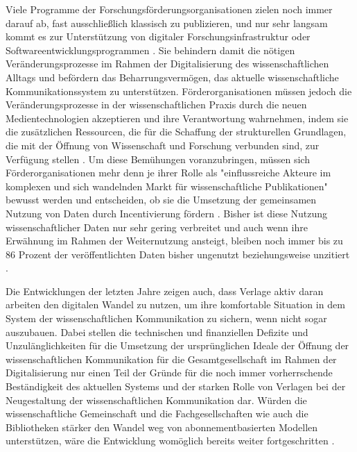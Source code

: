 Viele Programme der Forschungsförderungsorganisationen zielen noch immer darauf ab, fast ausschließlich klassisch zu publizieren, und nur sehr langsam kommt es zur Unterstützung von digitaler Forschungsinfrastruktur oder Softwareentwicklungsprogrammen \cite{Hey_2015}. Sie behindern damit die nötigen Veränderungsprozesse im Rahmen der Digitalisierung des wissenschaftlichen Alltags und befördern das Beharrungsvermögen, das aktuelle wissenschaftliche Kommunikationssystem zu unterstützen. Förderorganisationen müssen jedoch die Veränderungsprozesse in der wissenschaftlichen Praxis durch die neuen Medientechnologien akzeptieren und ihre Verantwortung wahrnehmen, indem sie die zusätzlichen Ressourcen, die für die Schaffung der strukturellen Grundlagen, die mit der Öffnung von Wissenschaft und Forschung verbunden sind, zur Verfügung stellen \cite{Mennes_2013} \cite{Patlak_2010}. Um diese Bemühungen voranzubringen, müssen sich Förderorganisationen mehr denn je ihrer Rolle als "einflussreiche Akteure im komplexen und sich wandelnden Markt für wissenschaftliche Publikationen" \cite[:287]{Wein_2010} bewusst werden und entscheiden, ob sie die Umsetzung der gemeinsamen Nutzung von Daten durch Incentivierung fördern \cite{Mennes_2013}. Bisher ist diese Nutzung wissenschaftlicher Daten nur sehr gering verbreitet und auch wenn ihre Erwähnung im Rahmen der Weiternutzung ansteigt, bleiben noch immer bis zu 86 Prozent der veröffentlichten Daten bisher ungenutzt beziehungsweise unzitiert \cite{Peters_2015}.

Die Entwicklungen der letzten Jahre zeigen auch, dass Verlage aktiv daran arbeiten den digitalen Wandel zu nutzen, um ihre komfortable Situation in dem System der wissenschaftlichen Kommunikation zu sichern, wenn nicht sogar auszubauen. Dabei stellen die technischen und finanziellen Defizite und Unzulänglichkeiten für die Umsetzung der ursprünglichen Ideale der Öffnung der wissenschaftlichen Kommunikation für die Gesamtgesellschaft im Rahmen der Digitalisierung nur einen Teil der Gründe für die noch immer vorherrschende Beständigkeit des aktuellen Systems und der starken Rolle von Verlagen bei der Neugestaltung der wissenschaftlichen Kommunikation dar. Würden die wissenschaftliche Gemeinschaft und die Fachgesellschaften wie auch die Bibliotheken stärker den Wandel weg von abonnementbasierten Modellen unterstützen, wäre die Entwicklung womöglich bereits weiter fortgeschritten \cite{Nosek_2012}.

